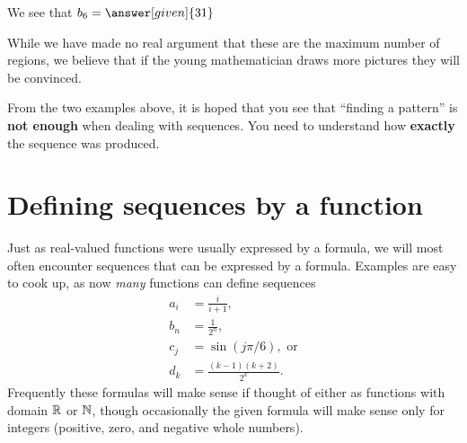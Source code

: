 \documentclass{ximera}
\begin{document}
\begin{example}
\begin{explanation}
\begin{itemize}
 We see that $b_6 = \answer[given]{31}$
    \end{itemize}
    While we have made no real argument that these are the maximum
    number of regions, we believe that if the young mathematician draws
    more pictures they will be convinced.
  \end{explanation}
\end{example}


From the two examples above, it is hoped that you see that ``finding a
pattern'' is \textbf{not enough} when dealing with sequences. You need
to understand how \textbf{exactly} the sequence was produced.




\section{Defining sequences by a function}

Just as real-valued functions were usually expressed by a formula, we
will most often encounter sequences that can be expressed by a
formula.  Examples are easy to cook up, as now \textit{many} functions
can define sequences
\begin{align*}
  a_i &=\frac{i}{i+1}, \\
  b_n &=\frac{1}{2^n}, \\
  c_j &=\sin(j\pi/6), \text{ or} \\
  d_k &=\frac{(k-1)(k+2)}{2^k}. 
\end{align*}
Frequently these formulas will make sense if thought of either as
functions with domain $\mathbb R$ or $\mathbb N$, though occasionally the given
formula will make sense only for integers (positive, zero, and
negative whole numbers).
\end{document}
